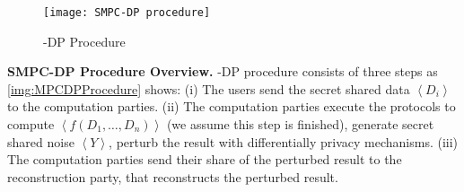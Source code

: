 \begin{figure}[htbp]
      \texttt{[image: SMPC-DP procedure]}
      \centering
      \caption{\smpc-DP Procedure}
      \label{img:MPCDPProcedure}
\end{figure}
\FloatBarrier

\textbf{SMPC-DP Procedure Overview.}
\smpc-DP procedure consists of three steps as \autoref{img:MPCDPProcedure} shows:
(i) The users send the secret shared data $\left\langle D_i\right\rangle $ to the computation parties.
(ii) The computation parties execute the \smpc protocols to compute $\left\langle f\left(D_1,\ldots, D_n\right) \right\rangle $ (we assume this step is finished), generate secret shared noise $\left\langle Y\right\rangle $, perturb the result with differentially privacy mechanisms.
(iii) The computation parties send their share of the perturbed result to the reconstruction party, that reconstructs the perturbed result.




